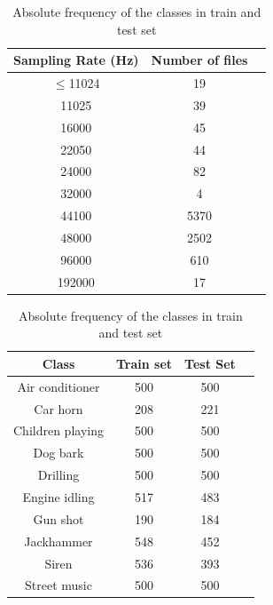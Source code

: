 \documentclass[oneside,openany]{article}
\begin{document}
    \begin{table}
    \hspace{-1.5cm}
    \parbox{.45\linewidth}{
\begin{center}
    \begin{tabular}{ |c|c|c| } 
    \hline
    \textbf{Sampling Rate (Hz)} & \textbf{Number of files} \\ 
    \hline
    $\leq$11024 & 19 \\ 
    11025 & 39 \\ 
    16000 & 45 \\ 
    22050 & 44 \\
    24000 & 82 \\ 
    32000 & 4 \\ 
    44100 & 5370 \\
    48000 & 2502 \\ 
    96000 & 610 \\ 
    192000 & 17 \\
    \hline
    \end{tabular}
    \captionsetup{justification=centering}
    \caption{Number of audio files with a given sampling rate}
    \label{table:fs}
    \end{center}
}
\hfill
\hspace{1cm}
\parbox{.45\linewidth}{
\begin{center}
    \begin{tabular}{ |c|c|c|c| } 
    \hline
    \textbf{Class} & \textbf{Train set} & \textbf{Test Set} \\ 
    \hline
    Air conditioner & 500 & 500\\
    Car horn & 208 & 221\\
    Children playing & 500 & 500\\
    Dog bark & 500 & 500\\
    Drilling & 500 & 500\\
    Engine idling & 517 & 483\\
    Gun shot & 190 & 184\\
    Jackhammer & 548 & 452\\
    Siren & 536 & 393\\
    Street music & 500 & 500\\
    \hline
    \end{tabular}
    \captionsetup{justification=centering}
    \caption{Absolute frequency of the classes in train and test set}
    \label{table:classes}
    \end{center}}
\end{table}
\end{document}
